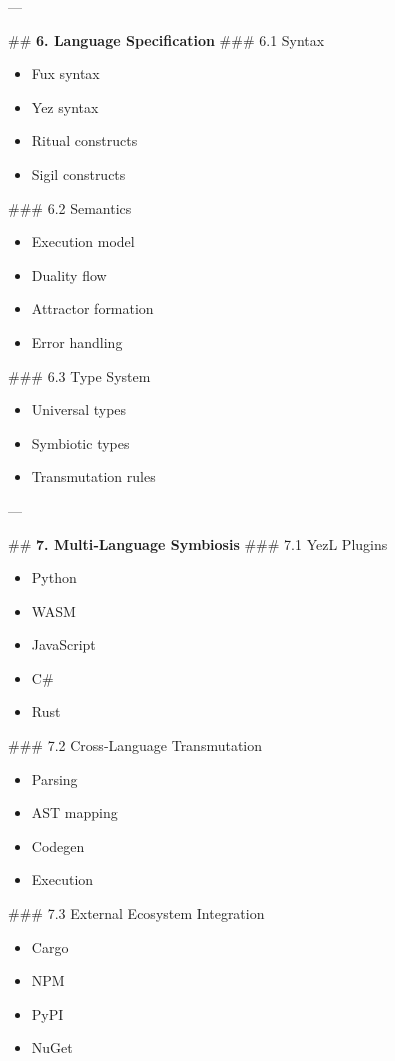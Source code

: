 \begin{enumerate}
---

\#\# \textbf{6. Language Specification}
\#\#\# 6.1 Syntax  
\begin{itemize}
  \item Fux syntax  
  \item Yez syntax  
  \item Ritual constructs  
  \item Sigil constructs  
\end{itemize}

\#\#\# 6.2 Semantics  
\begin{itemize}
  \item Execution model  
  \item Duality flow  
  \item Attractor formation  
  \item Error handling  
\end{itemize}

\#\#\# 6.3 Type System  
\begin{itemize}
  \item Universal types  
  \item Symbiotic types  
  \item Transmutation rules  
\end{itemize}

---

\#\# \textbf{7. Multi‑Language Symbiosis}
\#\#\# 7.1 YezL Plugins  
\begin{itemize}
  \item Python  
  \item WASM  
  \item JavaScript  
  \item C\#  
  \item Rust  
\end{itemize}

\#\#\# 7.2 Cross‑Language Transmutation  
\begin{itemize}
  \item Parsing  
  \item AST mapping  
  \item Codegen  
  \item Execution  
\end{itemize}

\#\#\# 7.3 External Ecosystem Integration  
\begin{itemize}
  \item Cargo  
  \item NPM  
  \item PyPI  
  \item NuGet  
\end{itemize}


\end{enumerate}

